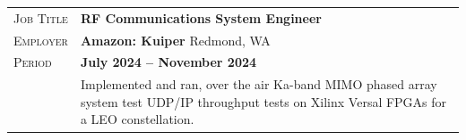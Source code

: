 \documentclass[a4paper, oneside, final]{scrartcl}
\newcommand{\gray}{\rowcolor[gray]{.90}} %
\begin{document}
\begin{center}
\begin{tabularx}{0.97\linewidth}{>{\raggedleft\scshape}p{2cm}X}
\gray Job Title & \textbf{RF Communications System Engineer}\\
\gray Employer & \textbf{Amazon: Kuiper} \hfill Redmond, WA\\
\gray Period & \textbf{July 2024 -- November 2024}\\
&
\vspace{-0.15 cm}
Implemented and ran, over the air Ka-band MIMO phased array system test UDP/IP throughput tests on Xilinx Versal FPGAs for a LEO constellation.  
\newline
\end{tabularx}


\end{center}
\end{document}

